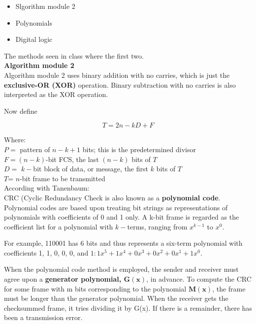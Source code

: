 \begin{itemize}
	\item Slgorithm module 2
	\item Polynomials
	\item Digital logic
\end{itemize}

The methods seen in class where the first two.\\


\textbf{Algorithm module 2}\\

Algorithm module 2 uses binary addition with no carries,
which is just the \textbf{ exclusive-OR (XOR)} operation. Binary subtraction with no carries
is also interpreted as the XOR operation.

Now define

\begin{equation*}
	T = 2n-kD + F
\end{equation*}

Where: \\
$P =$ pattern of $n - k + 1$ bits; this is the predetermined divisor\\
$F = (n - k)$-bit FCS, the last $(n - k)$ bits of $T$\\
$D =$ $k-$bit block of data, or message, the first $k$ bits of $T$\\
$T$= $n$-bit frame to be transmitted \\

According with Tanenbaum: \cite{tanenbaumwetherall2014}  \\

CRC (Cyclic Redundancy Check is  also known
as a \textbf{polynomial code}. Polynomial codes are based upon treating bit strings as
representations of polynomials with coefficients of 0 and 1 only. A k-bit frame is
regarded as the coefficient list for a polynomial with $k-$terms, ranging from $x^{k-1}$
to $x^0$.

For example, 110001 has 6 bits and thus represents a six-term polynomial with
coefficients 1, 1, 0, 0, 0, and $ 1: 1x^5 + 1x^4 + 0x^3 + 0x^2 + 0x^1 + 1x^0.$

When the polynomial code method is employed, the sender and receiver must
agree upon a \textbf{ generator polynomial, $\mathbf{G(x)}$}, in advance.  To compute the CRC for some frame with
m bits corresponding to the polynomial $ \mathbf{M(x)}$, the frame must be longer than the
generator polynomial.  When the receiver gets the checksummed frame, it tries dividing it
by G(x). If there is a remainder, there has been a transmission error.

